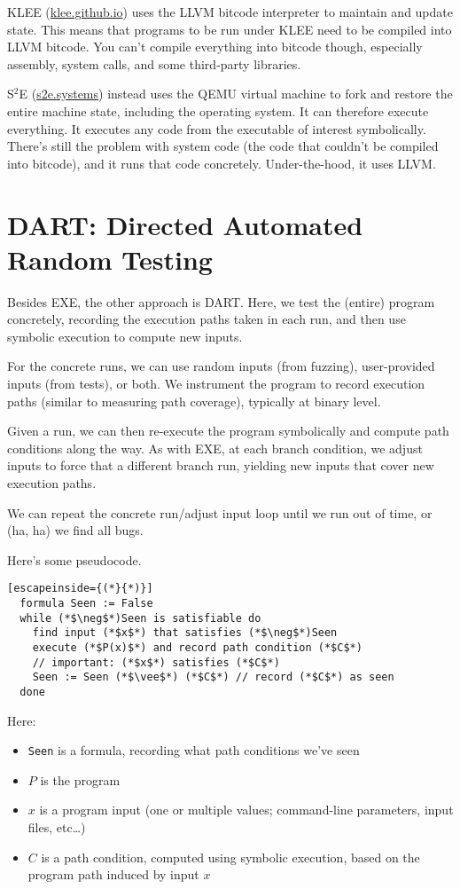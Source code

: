 \documentclass[11pt]{article}
\begin{document}
KLEE (\url{klee.github.io}) uses the LLVM bitcode interpreter to maintain and update state. This means that programs to be run under KLEE need to be compiled into LLVM bitcode.
You can't compile everything into bitcode though, especially assembly, system calls, and some third-party libraries.

S$^2$E (\url{s2e.systems}) instead uses the QEMU virtual machine to fork and restore the entire machine state, including the operating system. It can therefore execute everything.
It executes any code from the executable of interest symbolically. There's still the problem with system code (the code that couldn't be compiled into bitcode), and it runs that
code concretely. Under-the-hood, it uses LLVM.

\section{DART: Directed Automated Random Testing}
Besides EXE, the other approach is DART. Here, we test the (entire) program concretely, recording the execution paths taken in each run, and then use symbolic execution to compute new inputs.

For the concrete runs, we can use random inputs (from fuzzing), user-provided inputs (from tests), or both. We instrument the program to record execution paths (similar to measuring
path coverage), typically at binary level.

Given a run, we can then re-execute the program symbolically and compute path conditions along the way. As with EXE, at each branch condition, we adjust inputs to force
that a different branch run, yielding new inputs that cover new execution paths.

We can repeat the concrete run/adjust input loop until we run out of time, or (ha, ha) we find all bugs.

Here's some pseudocode.
\begin{lstlisting}[escapeinside={(*}{*)}]
  formula Seen := False
  while (*$\neg$*)Seen is satisfiable do
    find input (*$x$*) that satisfies (*$\neg$*)Seen
    execute (*$P(x)$*) and record path condition (*$C$*)
    // important: (*$x$*) satisfies (*$C$*)
    Seen := Seen (*$\vee$*) (*$C$*) // record (*$C$*) as seen
  done
\end{lstlisting}
Here:
\begin{itemize}[noitemsep]
\item \texttt{Seen} is a formula, recording what path conditions we've seen
\item $P$ is the program
\item $x$ is a program input (one or multiple values; command-line parameters, input files, etc\ldots)
\item $C$ is a path condition, computed using symbolic execution, based on the program path induced by input $x$
\end{itemize}
\end{document}

